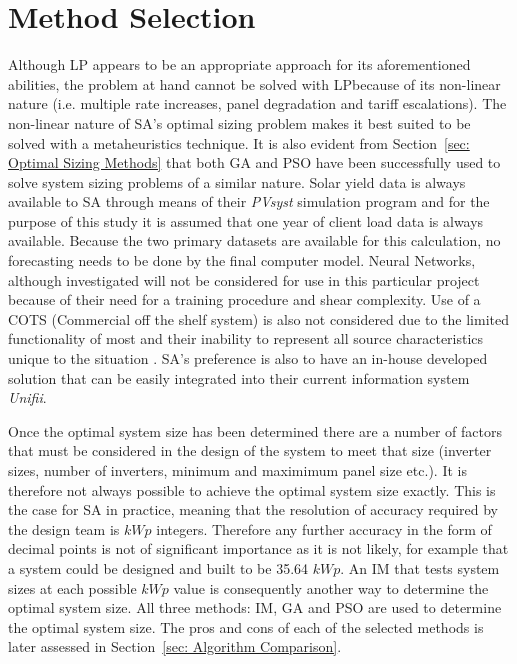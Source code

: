 \documentclass[a4paper,11pt,fleqn]{report}
\begin{document}
\section{Method Selection} \label{sec: Method Selection}
Although \ac{LP} appears to be an appropriate approach for its aforementioned abilities, the problem at hand cannot be solved with \ac{LP}because of its non-linear nature (i.e. multiple rate increases, panel degradation and tariff escalations). The non-linear nature of \ac{SA}'s optimal sizing problem makes it best suited to be solved with a metaheuristics technique. It is also evident from Section~\ref{sec: Optimal Sizing Methods} that both \ac{GA} and \ac{PSO} have been successfully used to solve system sizing problems of a similar nature. Solar yield data is always available to \ac{SA} through means of their \textit{PVsyst} simulation program and for the purpose of this study it is assumed that one year of client load data is always available. Because the two primary datasets are available for this calculation, no forecasting needs to be done by the final computer model. Neural Networks, although investigated will not be considered for use in this particular project because of their need for a training procedure and shear complexity. Use of a COTS (Commercial off the shelf system) is also not considered due to the limited functionality of most and their inability to represent all source characteristics unique to the situation \citep{erdinc2012}. \ac{SA}'s preference is also to have an in-house developed solution that can be easily integrated into their current information system \textit{Unifii}.
 
Once the optimal system size has been determined there are a number of factors that must be considered in the design of the system to meet that size (inverter sizes, number of inverters, minimum and maximimum panel size etc.). It is therefore not always possible to achieve the optimal system size exactly. This is the case for \ac{SA} in practice, meaning that the resolution of accuracy required by the design team is $kWp$ integers.  Therefore any further accuracy in the form of decimal points is not of significant importance as it is not likely, for example that a system could be designed and built to be 35.64 $kWp$. An \ac{IM} that tests system sizes at each possible $kWp$ value is consequently another way to determine the optimal system size. All three methods: \ac{IM}, \ac{GA} and \ac{PSO} are used to determine the optimal system size. The pros and cons of each of the selected methods is later assessed in Section~\ref{sec: Algorithm Comparison}. 
\end{document}
